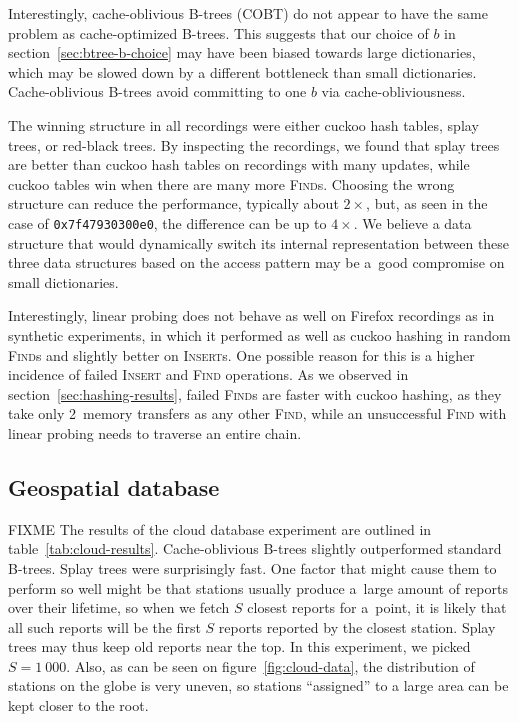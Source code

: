 Interestingly, cache-oblivious B-trees (COBT) do not appear to have the same
problem as cache-optimized \mbox{B-trees}. This suggests that our choice
of $b$ in section~\ref{sec:btree-b-choice} may have been biased towards
large dictionaries, which may be slowed down by a different bottleneck
than small dictionaries. Cache-oblivious B-trees avoid committing to one
$b$ via cache-obliviousness.

The winning structure in all recordings were either cuckoo hash tables,
splay trees, or red-black trees.
By inspecting the recordings, we found that splay trees are better than
cuckoo hash tables on recordings with many updates, while cuckoo tables
win when there are many more \textsc{Find}s. Choosing the wrong structure
can reduce the performance, typically about $2\times$, but, as seen in the
case of \texttt{0x7f47930300e0}, the difference can be up to $4\times$.
We believe a data structure that would dynamically switch
its internal representation between these three data structures based
on the access pattern may be a~good compromise on small dictionaries.

Interestingly, linear probing does not behave as well on Firefox recordings
as in synthetic experiments, in which it performed as well as cuckoo hashing
in random \textsc{Find}s and slightly better on \textsc{Insert}s. One possible
reason for this is a higher incidence of failed \textsc{Insert} and
\textsc{Find} operations. As we observed in section~\ref{sec:hashing-results},
failed \textsc{Find}s are faster with cuckoo hashing, as they take only
2~memory transfers as any other \textsc{Find}, while an unsuccessful
\textsc{Find} with linear probing needs to traverse an entire chain.

\subsection{Geospatial database}
FIXME
The results of the cloud database experiment are outlined in
table~\ref{tab:cloud-results}. Cache-oblivious \mbox{B-trees} slightly outperformed
standard \mbox{B-trees}. Splay trees were surprisingly fast. One factor that
might cause them to perform so well might be that stations usually produce
a~large amount of reports over their lifetime, so when we fetch $S$ closest
reports for a~point, it is likely that all such reports will be the first $S$
reports reported by the closest station. Splay trees may thus keep old reports
near the top. In this experiment, we picked $S=1~000$. Also, as can be
seen on figure~\ref{fig:cloud-data}, the distribution of stations on the globe
is very uneven, so stations ``assigned'' to a large area can be kept closer to
the root.

